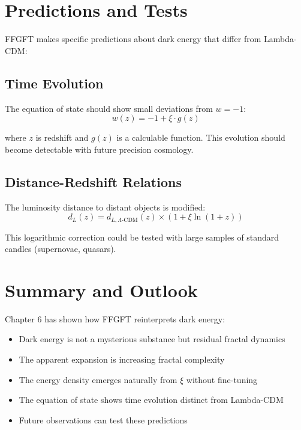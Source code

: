 \section{Predictions and Tests}

FFGFT makes specific predictions about dark energy that differ from Lambda-CDM:

\subsection{Time Evolution}

The equation of state should show small deviations from $w = -1$:
\begin{equation}
w(z) = -1 + \xi \cdot g(z)
\end{equation}

where $z$ is redshift and $g(z)$ is a calculable function. This evolution should become detectable with future precision cosmology.

\subsection{Distance-Redshift Relations}

The luminosity distance to distant objects is modified:
\begin{equation}
d_L(z) = d_{L,\Lambda\text{-CDM}}(z) \times \left(1 + \xi \ln(1+z)\right)
\end{equation}

This logarithmic correction could be tested with large samples of standard candles (supernovae, quasars).

\section{Summary and Outlook}

Chapter 6 has shown how FFGFT reinterprets dark energy:

\begin{itemize}[leftmargin=*]
\item Dark energy is not a mysterious substance but residual fractal dynamics
\item The apparent expansion is increasing fractal complexity
\item The energy density emerges naturally from $\xi$ without fine-tuning
\item The equation of state shows time evolution distinct from Lambda-CDM
\item Future observations can test these predictions
\end{itemize}

